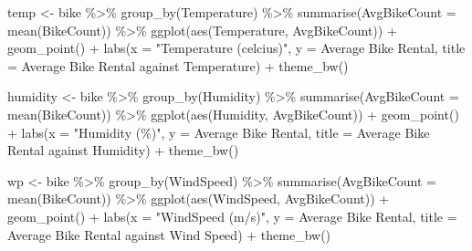 \documentclass[
]{article}
\newenvironment{Shaded}{\begin{snugshade}}{\end{snugshade}}
\newcommand{\AttributeTok}[1]{\textcolor[rgb]{0.77,0.63,0.00}{#1}}
\newcommand{\FunctionTok}[1]{\textcolor[rgb]{0.00,0.00,0.00}{#1}}
\newcommand{\NormalTok}[1]{#1}
\newcommand{\OtherTok}[1]{\textcolor[rgb]{0.56,0.35,0.01}{#1}}
\newcommand{\SpecialCharTok}[1]{\textcolor[rgb]{0.00,0.00,0.00}{#1}}
\newcommand{\StringTok}[1]{\textcolor[rgb]{0.31,0.60,0.02}{#1}}
\begin{document}
\begin{Shaded}
\begin{Highlighting}[]
\NormalTok{temp }\OtherTok{\textless{}{-}}\NormalTok{ bike }\SpecialCharTok{\%\textgreater{}\%} \FunctionTok{group\_by}\NormalTok{(Temperature) }\SpecialCharTok{\%\textgreater{}\%}
  \FunctionTok{summarise}\NormalTok{(}\AttributeTok{AvgBikeCount =} \FunctionTok{mean}\NormalTok{(BikeCount)) }\SpecialCharTok{\%\textgreater{}\%}
  \FunctionTok{ggplot}\NormalTok{(}\FunctionTok{aes}\NormalTok{(Temperature, AvgBikeCount)) }\SpecialCharTok{+}
  \FunctionTok{geom\_point}\NormalTok{() }\SpecialCharTok{+} 
  \FunctionTok{labs}\NormalTok{(}\AttributeTok{x =} \StringTok{"Temperature (celcius)"}\NormalTok{, }\AttributeTok{y =} \StringTok{\textquotesingle{}Average Bike Rental\textquotesingle{}}\NormalTok{,}
       \AttributeTok{title =} \StringTok{\textquotesingle{}Average Bike Rental against Temperature\textquotesingle{}}\NormalTok{) }\SpecialCharTok{+} \FunctionTok{theme\_bw}\NormalTok{()}

\NormalTok{humidity }\OtherTok{\textless{}{-}}\NormalTok{ bike }\SpecialCharTok{\%\textgreater{}\%} \FunctionTok{group\_by}\NormalTok{(Humidity) }\SpecialCharTok{\%\textgreater{}\%}
  \FunctionTok{summarise}\NormalTok{(}\AttributeTok{AvgBikeCount =} \FunctionTok{mean}\NormalTok{(BikeCount)) }\SpecialCharTok{\%\textgreater{}\%}
  \FunctionTok{ggplot}\NormalTok{(}\FunctionTok{aes}\NormalTok{(Humidity, AvgBikeCount)) }\SpecialCharTok{+}
  \FunctionTok{geom\_point}\NormalTok{() }\SpecialCharTok{+} 
  \FunctionTok{labs}\NormalTok{(}\AttributeTok{x =} \StringTok{"Humidity (\%)"}\NormalTok{, }\AttributeTok{y =} \StringTok{\textquotesingle{}Average Bike Rental\textquotesingle{}}\NormalTok{,}
       \AttributeTok{title =} \StringTok{\textquotesingle{}Average Bike Rental against Humidity\textquotesingle{}}\NormalTok{) }\SpecialCharTok{+} \FunctionTok{theme\_bw}\NormalTok{()}

\NormalTok{wp }\OtherTok{\textless{}{-}}\NormalTok{ bike }\SpecialCharTok{\%\textgreater{}\%} \FunctionTok{group\_by}\NormalTok{(WindSpeed) }\SpecialCharTok{\%\textgreater{}\%}
  \FunctionTok{summarise}\NormalTok{(}\AttributeTok{AvgBikeCount =} \FunctionTok{mean}\NormalTok{(BikeCount)) }\SpecialCharTok{\%\textgreater{}\%}
  \FunctionTok{ggplot}\NormalTok{(}\FunctionTok{aes}\NormalTok{(WindSpeed, AvgBikeCount)) }\SpecialCharTok{+}
  \FunctionTok{geom\_point}\NormalTok{() }\SpecialCharTok{+} 
  \FunctionTok{labs}\NormalTok{(}\AttributeTok{x =} \StringTok{"WindSpeed (m/s)"}\NormalTok{, }\AttributeTok{y =} \StringTok{\textquotesingle{}Average Bike Rental\textquotesingle{}}\NormalTok{,}
       \AttributeTok{title =} \StringTok{\textquotesingle{}Average Bike Rental against Wind Speed\textquotesingle{}}\NormalTok{) }\SpecialCharTok{+} \FunctionTok{theme\_bw}\NormalTok{()}


\end{Highlighting}
\end{Shaded}
\end{document}
